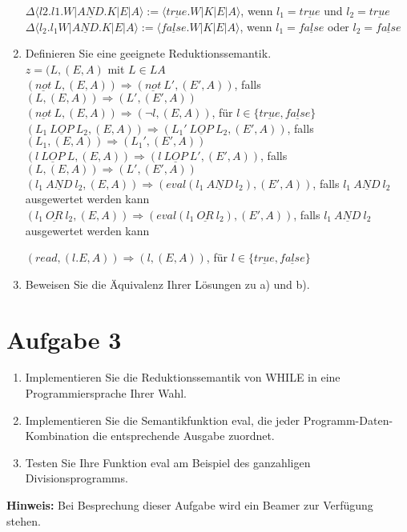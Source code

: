 \documentclass[ngerman,a4paper]{report}
\begin{document}
\begin{enumerate}
$\Delta\langle l2.l1.W|\underline{AND}.K|E|A\rangle:= \langle \underline{true}.W|K|E|A\rangle$, wenn $l_1=\underline{true}$ und $l_2=\underline{true}$\\
$\Delta\langle l_2.l_1W|\underline{AND}.K|E|A\rangle:= \langle \underline{false}.W|K|E|A\rangle$, wenn $l_1=\underline{false}$ oder $l_2=\underline{false}$\\
\item Definieren Sie eine geeignete Reduktionssemantik.\\
$z=(L, (E,A)$ mit $L \in LA$\\
$(\underline{not}\  L,(E,A)) \Rightarrow (\underline{not}\  L',(E',A))$, falls $(L,(E,A)) \Rightarrow (L',(E',A))$\\
$(\underline{not}\  L,(E,A)) \Rightarrow (\neg l,(E,A))$, für $l\in\{\underline{true},\underline{false}\}$\\

$(L_1\ \underline{LOP}\ L_2,(E,A)) \Rightarrow (L_1'\ \underline{LOP}\ L_2,(E',A))$, falls $(L_1,(E,A)) \Rightarrow (L_1',(E',A))$\\

$(l\ \underline{LOP}\ L,(E,A)) \Rightarrow (l\ \underline{LOP}\ L',(E',A))$, falls $(L,(E,A)) \Rightarrow (L',(E',A))$\\

$(l_1\ \underline{AND}\ l_2,(E,A)) \Rightarrow (eval(l_1\ \underline{AND}\ l_2),(E',A))$, falls $l_1\ \underline{AND}\ l_2$ ausgewertet werden kann
$(l_1\ \underline{OR}\ l_2,(E,A)) \Rightarrow (eval(l_1\ \underline{OR}\ l_2),(E',A))$, falls $l_1\ \underline{AND}\ l_2$ ausgewertet werden kann

$(read,(l.E,A)) \Rightarrow (l,(E,A))$, für $l\in\{\underline{true},\underline{false}\}$\\
\item Beweisen Sie die Äquivalenz Ihrer Lösungen zu a) und b).


\end{enumerate}
\section*{Aufgabe 3 }
\begin{enumerate}
	\item Implementieren Sie die Reduktionssemantik von WHILE in eine Programmiersprache Ihrer Wahl.
	\item Implementieren Sie die Semantikfunktion eval, die jeder Programm-Daten-Kombination die entsprechende Ausgabe zuordnet.
	\item Testen Sie Ihre Funktion eval am Beispiel des ganzahligen Divisionsprogramms.
\end{enumerate}
\textbf{Hinweis:} Bei Besprechung dieser Aufgabe wird ein Beamer zur Verfügung stehen.
\end{document}
